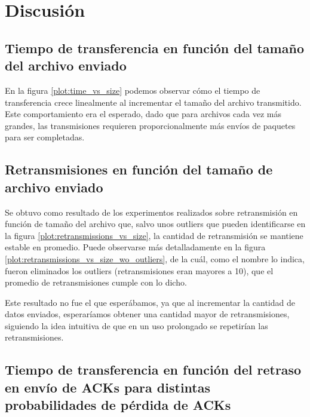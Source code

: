 \documentclass[a4paper, 10pt, twoside]{article}
\begin{document}


\section{Discusión}
\label{sec:discusion}


\subsection{Tiempo de transferencia en función del tamaño del archivo enviado}

En la figura \ref{plot:time_vs_size} podemos observar cómo el tiempo de transferencia crece linealmente al incrementar el tamaño del archivo transmitido. Este comportamiento era el esperado, dado que para archivos cada vez más grandes, las transmisiones requieren proporcionalmente más envíos de paquetes para ser completadas.


\subsection{Retransmisiones en función del tamaño de archivo enviado}

Se obtuvo como resultado de los experimentos realizados sobre retransmisión en función de tamaño del archivo que, salvo unos outliers que pueden identificarse en la figura \ref{plot:retransmissions_vs_size}, la cantidad de retransmisión se mantiene estable en promedio. Puede observarse más detalladamente en la figura \ref{plot:retransmissions_vs_size_wo_outliers}, de la cuál, como el nombre lo indica, fueron eliminados los outliers (retransmisiones eran mayores a 10), que el promedio de retransmisiones cumple con lo dicho.

Este resultado no fue el que esperábamos, ya que al incrementar la cantidad de datos enviados, esperaríamos obtener una cantidad mayor de retransmisiones, siguiendo la idea intuitiva de que en un uso prolongado se repetirían las retransmisiones.


\subsection{Tiempo de transferencia en función del retraso en envío de ACKs para distintas probabilidades de pérdida de ACKs}
\end{document}
